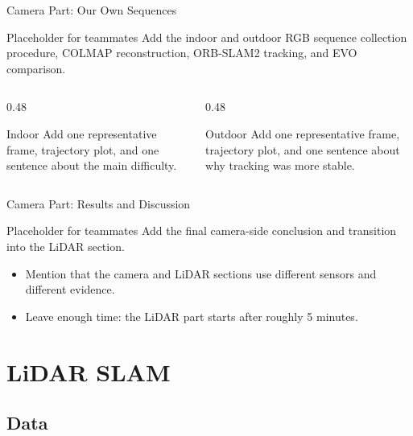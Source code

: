 \documentclass[aspectratio=169]{beamer}
\newcommand{\placeholderbox}[2]{%
  \begin{block}{#1}
    \large #2
  \end{block}
}
\begin{document}
\begin{frame}{Camera Part: Our Own Sequences}
  \placeholderbox{Placeholder for teammates}{%
    Add the indoor and outdoor RGB sequence collection procedure, COLMAP reconstruction, ORB-SLAM2 tracking, and EVO comparison.}

  \vfill
  \begin{columns}[T,onlytextwidth]
    \begin{column}{0.48\textwidth}
      \begin{block}{Indoor}
        Add one representative frame, trajectory plot, and one sentence about the main difficulty.
      \end{block}
    \end{column}
    \begin{column}{0.48\textwidth}
      \begin{block}{Outdoor}
        Add one representative frame, trajectory plot, and one sentence about why tracking was more stable.
      \end{block}
    \end{column}
  \end{columns}
\end{frame}

\begin{frame}{Camera Part: Results and Discussion}
  \placeholderbox{Placeholder for teammates}{%
    Add the final camera-side conclusion and transition into the LiDAR section.}

  \vfill
  \begin{itemize}
    \item Mention that the camera and LiDAR sections use different sensors and different evidence.
    \item Leave enough time: the LiDAR part starts after roughly 5 minutes.
  \end{itemize}
\end{frame}

\section{LiDAR SLAM}
\subsection{Data}
\end{document}
